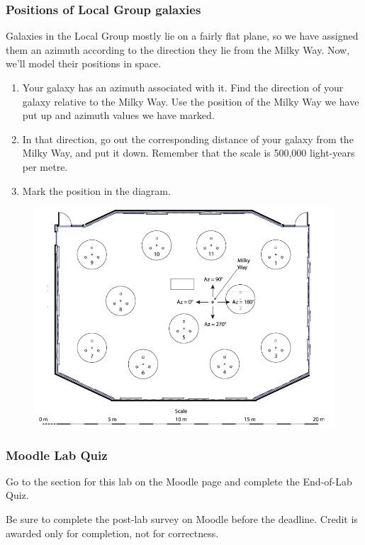\documentclass[main.tex]{subfiles}
\begin{document}
\subsubsection{Positions of Local Group galaxies}
Galaxies in the Local Group mostly lie on a fairly flat plane, so we have assigned them an azimuth according to the direction they lie from the Milky Way. Now, we'll model their positions in space.
\begin{enumerate}
\item Your galaxy has an azimuth associated with it. Find the direction of your galaxy relative to the Milky Way. Use the position of the Milky Way we have put up and azimuth values we have marked.
\item In that direction, go out the corresponding distance of your galaxy from the Milky Way, and put it down. Remember that the scale is 500,000 light-years per metre.
\item Mark the position in the diagram.
\end{enumerate}
\begin{figure}[htbp]
\begin{center}
\includegraphics[width=\textwidth]{galclass.png}
\label{fig:galclass}
\end{center}
\end{figure}
 
\subsubsection{Moodle Lab Quiz}
Go to the section for this lab on the Moodle page and complete the End-of-Lab Quiz.

Be sure to complete the post-lab survey on Moodle before the deadline. Credit is awarded only for completion, not for correctness.
\end{document}
